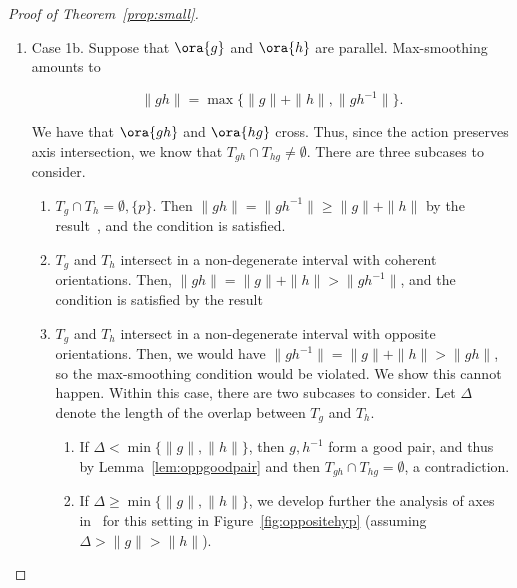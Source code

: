 \begin{proof}[Proof of Theorem~\ref{prop:small}]
\begin{enumerate}[wide, labelindent=0pt]
\begin{enumerate}
\[
\|g \| + \| h \| = \max \{ \| gh \|, \| gh^{-1} \| \}.
\]

This relation is true by~\cite[1.8]{CM87:GroupActions}, since $T_g \cap T_h \neq \emptyset$.
\item Case 1b. Suppose that $\ora{g}$ and $\ora{h}$ are parallel.
Max-smoothing amounts to

\[
\| gh \| = \max \{ \| g \| +\| h \| , \| gh^{-1} \| \}.
\]

 We have that $\ora{gh}$ and $\ora{hg}$ cross. Thus, since the action preserves axis intersection, we know that $T_{gh} \cap T_{hg} \neq \emptyset$.
There are three subcases to consider.
\begin{enumerate}
    \item $T_g \cap T_h = \emptyset, \{ p \}$. Then $\|gh\|=\|gh^{-1}\| \geq \|g\|+\|h\|$ by the result~\cite[1.5]{CM87:GroupActions}, and the condition is satisfied.
    \item $T_g$ and $T_h$ intersect in a non-degenerate interval with coherent orientations.
    Then, 
    $\|gh\|=\|g\|+\|h\|>\|gh^{-1}\|$, and the condition is satisfied by the result~\cite[1.8]{CM87:GroupActions}
    \item  $T_g$ and $T_h$ intersect in a non-degenerate interval with opposite orientations. Then, we would have
    $\|gh^{-1}\|=\|g\|+\|h\|>\|gh\|$, so the max-smoothing condition would be violated.
    We show this cannot happen. 
    Within this case, there are two subcases to consider. Let $\Delta$ denote the length of the overlap between $T_g$ and $T_h$.
    \begin{enumerate}
        \item If $\Delta<\min \{ \| g \|, \| h \| \}$, then $g, h^{-1}$ form a good pair, and thus by Lemma~\ref{lem:oppgoodpair} and then $T_{gh} \cap T_{hg} = \emptyset$, a contradiction.
        \item If $\Delta \geq \min \{ \| g \|, \| h \| \}$, we develop further the analysis of axes in~\cite[Lemma~3.4]{Chi01:LambdaTrees} for this setting in Figure~\ref{fig:oppositehyp} (assuming $\Delta> \|g \| > \| h \|$).
              \begin{figure}
\end{figure}


\end{enumerate}
\end{enumerate}
\end{enumerate}
\end{enumerate}
\end{proof}
